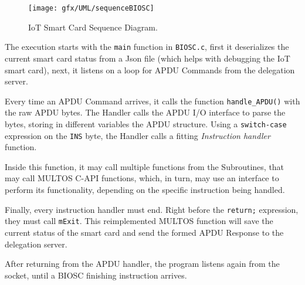 \begin{figure*}[bth]
	\centering
	\texttt{[image: gfx/UML/sequenceBIOSC]}
	\caption{IoT Smart Card Sequence Diagram.}
	\label{fig:sequenceBIOSC}
\end{figure*}



The execution starts with the \texttt{main} function in \texttt{BIOSC.c}, first it deserializes the current smart card status from a Json file (which helps with debugging the IoT smart card), next, it listens on a loop for APDU Commands from the delegation server.

Every time an APDU Command arrives, it calls the function \texttt{handle\_APDU()} with the raw APDU bytes. The Handler calls the APDU I/O interface to parse the bytes, storing in different variables the APDU structure. Using a \texttt{switch-case} expression on the \texttt{INS} byte, the Handler calls a fitting \textit{Instruction handler} function.

Inside this function, it may call multiple functions from the Subroutines, that may call MULTOS C-API functions, which, in turn, may use an interface to perform its functionality, depending on the specific instruction being handled.

Finally, every instruction handler must end. Right before the \texttt{return;} expression, they must call \texttt{mExit}. This reimplemented MULTOS function will save the current status of the smart card and send the formed APDU Response to the delegation server.

After returning from the APDU handler, the program listens again from the socket, until a BIOSC finishing instruction arrives.


